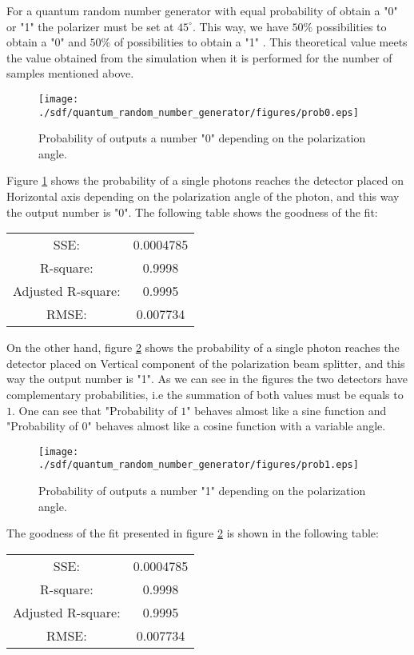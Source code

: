 \begin{refsection}
For a quantum random number generator with equal probability of obtain a "0" \space or "1" \space the polarizer must be set at $45^{\circ}$. This way, we have $50\%$ possibilities to obtain a "0" \space and $50\%$ of possibilities to obtain a "1" \space. This theoretical value meets the value obtained from the simulation when it is performed for the number of samples mentioned above.

\begin{figure}[H]
    \centering
        \texttt{[image: ./sdf/quantum\_random\_number\_generator/figures/prob0.eps]}
    \caption{Probability of outputs a number "0" \space depending on the polarization angle.}\label{probx}
\end{figure}

Figure \ref{probx} shows the probability of a single photons reaches the detector placed on Horizontal axis depending on the polarization angle of the photon, and this way the output number is "0". The following table shows the goodness of the fit:
\begin{table}[H]
\centering
\label{tab:goodnessfitprob0}
    \begin{tabular}{c|c}
      SSE:                  & 0.0004785\\
      R-square:             &0.9998\\
      Adjusted R-square:    &0.9995\\
      RMSE:                 &0.007734
  \end{tabular}
\end{table}

On the other hand, figure \ref{proby} shows the probability of a single photon reaches the detector placed on Vertical component of the polarization beam splitter, and this way the output number is "1". As we can see in the figures the two detectors have complementary probabilities, i.e the summation of both values must be equals to $1$. One can see that "Probability of $1$" \space behaves almost like a sine function and "Probability of 0" \space behaves almost like a cosine function with a variable angle.

\begin{figure}[H]
    \centering
        \texttt{[image: ./sdf/quantum\_random\_number\_generator/figures/prob1.eps]}
    \caption{Probability of outputs a number "1" \space depending on the polarization angle.}\label{proby}
\end{figure}

The goodness of the fit presented in figure \ref{proby} is shown in the following table:
\begin{table}[H]
\centering
\label{tab:goodnessfitprob0}
    \begin{tabular}{c|c}
        SSE:                &0.0004785\\
        R-square:           &0.9998\\
        Adjusted R-square:  &0.9995\\
        RMSE:               &0.007734
  \end{tabular}
\end{table}


\end{refsection}
